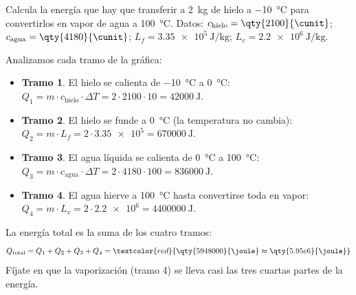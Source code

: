 \begin{example}
    Calcula la energía que hay que transferir a \qty{2}{\kg} de hielo a \qty{-10}{\degreeCelsius} para convertirlos en vapor de agua a \qty{100}{\degreeCelsius}. Datos: \(c_{\text{hielo}} = \qty{2100}{\cunit}\); \(c_{\text{agua}} = \qty{4180}{\cunit}\); \(L_f = \qty{3.35e5}{\joule\per\kg}\); \(L_v = \qty{2.2e6}{\joule\per\kg}\).

    \begin{center}
    \end{center}

    Analizamos cada tramo de la gráfica:
    \begin{itemize}
        \item \textbf{Tramo 1}. El hielo se calienta de \qty{-10}{\degreeCelsius} a \qty{0}{\degreeCelsius}:\\ \(Q_1 = m \cdot c_{\text{hielo}} \cdot \Delta T = 2 \cdot 2100 \cdot 10 = \qty{42000}{\joule}\).
        \item \textbf{Tramo 2}. El hielo se funde a \qty{0}{\degreeCelsius} (la temperatura no cambia):\\ \(Q_2 = m \cdot L_f = 2 \cdot \num{3.35e5} = \qty{670000}{\joule}\).
        \item \textbf{Tramo 3}. El agua líquida se calienta de \qty{0}{\degreeCelsius} a \qty{100}{\degreeCelsius}:\\ \(Q_3 = m \cdot c_{\text{agua}} \cdot \Delta T = 2 \cdot 4180 \cdot 100 = \qty{836000}{\joule}\).
        \item \textbf{Tramo 4}. El agua hierve a \qty{100}{\degreeCelsius} hasta convertirse toda en vapor:\\ \(Q_4 = m \cdot L_v = 2 \cdot \num{2.2e6} = \qty{4400000}{\joule}\).
    \end{itemize}
    La energía total es la suma de los cuatro tramos:
    \[ Q_{\text{total}} = Q_1 + Q_2 + Q_3 + Q_4 = \textcolor{red}{\qty{5948000}{\joule} \approx \qty{5.95e6}{\joule}} \]
    Fíjate en que la vaporización (tramo 4) se lleva casi las tres cuartas partes de la energía.
\end{example}

